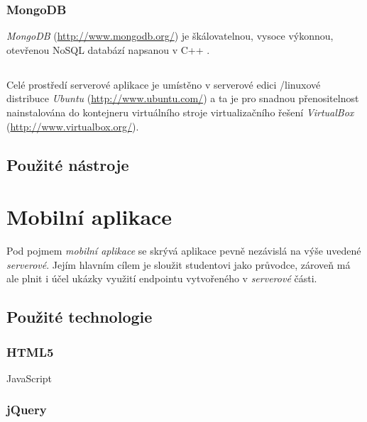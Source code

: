 \subsubsection{MongoDB}
\emph{MongoDB} (\url{http://www.mongodb.org/}) je škálovatelnou, vysoce výkonnou, otevřenou NoSQL databází napsanou v C++ \cite{Mongo}.

\subsection*{ }
Celé prostředí serverové aplikace je umístěno v serverové edici /linuxové distribuce \emph{Ubuntu} (\url{http://www.ubuntu.com/}) a ta je pro snadnou přenositelnost nainstalována do kontejneru virtuálního stroje virtualizačního řešení \emph{VirtualBox} (\url{http://www.virtualbox.org/}).

\subsection{Použité nástroje}





\section{Mobilní aplikace}
Pod pojmem \textit{mobilní aplikace} se skrývá aplikace pevně nezávislá na výše uvedené \textit{serverové}. Jejím hlavním cílem je sloužit studentovi   jako průvodce, zároveň má ale plnit i účel ukázky využití  endpointu vytvořeného v \textit{serverové} části.

\subsection{Použité technologie}
\subsubsection{HTML5}
JavaScript
\subsubsection{jQuery}

